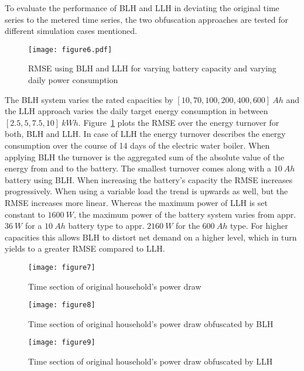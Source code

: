\documentclass{article}
\begin{document}
To evaluate the performance of \ac{BLH} and \ac{LLH} in deviating the original time series to the metered time series, the two obfuscation approaches are tested for different simulation cases mentioned.
\begin{figure}[h!]
	\centering
	\texttt{[image: figure6.pdf]}
	\caption{\ac{RMSE} using \ac{BLH} and \ac{LLH} for varying battery capacity and varying daily power consumption}  
	\label{rmse}
\end{figure}
The BLH system varies the rated capacities by $[10, 70, 100, 200, 400,  600]\:Ah$ and the LLH approach varies the daily target energy consumption in between $[ 2.5, 5, 7.5, 10]\:kWh$.
Figure~\ref{rmse} plots the \ac{RMSE} over the energy turnover for both, \ac{BLH} and \ac{LLH}. In case of \ac{LLH} the energy turnover describes the energy consumption over the course of 14 days of the electric water boiler. When applying \ac{BLH} the turnover is the aggregated sum of the absolute value of the energy from and to the battery. The smallest turnover comes along with a $10\:Ah$ battery using \ac{BLH}. When increasing the battery's capacity the \ac{RMSE} increases progressively. When using a variable load the trend is upwards as well, but the \ac{RMSE} increases more linear. Whereas the maximum power of \ac{LLH} is set constant to $1600\:W$, the maximum power of the battery system varies from appr. $36\:W$ for a $10\:Ah$ battery type to appr. $2160\:W$ for the $600\:Ah$ type. For higher capacities this allows \ac{BLH} to distort net demand on a higher level, which in turn yields to a greater \ac{RMSE} compared to \ac{LLH}.


\begin{landscape}
\begin{figure*}
\begin{minipage}{0,32\columnwidth}
		\texttt{[image: figure7]}
	\caption{Time section of original household's power draw}
		\label{fig:originalTS}
\end{minipage}
\begin{minipage}{0,32\columnwidth}
		\texttt{[image: figure8]}
	\caption{Time section of original household's power draw obfuscated by \ac{BLH}}
		\label{fig:blhTS}
\end{minipage}
\begin{minipage}{0,32\columnwidth}
		\texttt{[image: figure9]}
	\caption{Time section of original household's power draw obfuscated by \ac{LLH}}
		\label{fig:llhTS}
\end{minipage}
\end{figure*}
\end{landscape}
\end{document}

